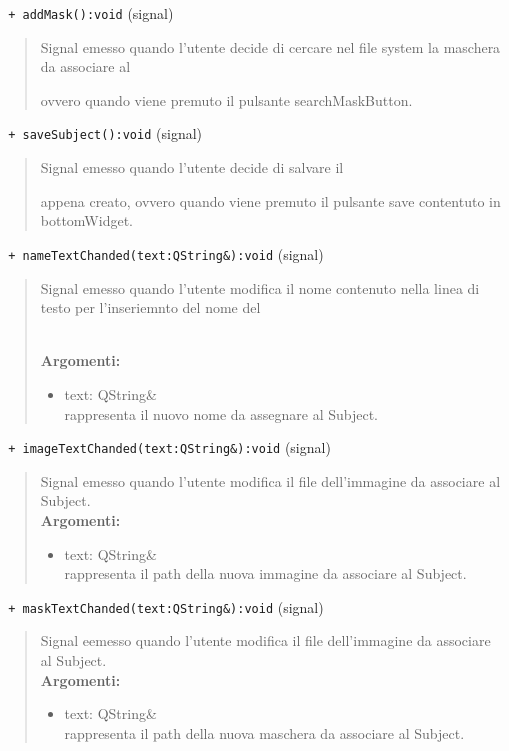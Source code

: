 \color{blue}\verb! + addMask():void! (signal)
\color{black} 
\begin{quote}
Signal\g{} emesso quando l'utente decide di cercare nel file system la maschera da associare al \subject{} ovvero quando viene premuto il pulsante searchMaskButton.
\end{quote}
\color{blue}\verb! + saveSubject():void! (signal)
\color{black} 
\begin{quote}
Signal\g{} emesso quando l'utente decide di salvare il \subject{} appena creato, ovvero quando viene premuto il pulsante save contentuto in bottomWidget.
\end{quote}
\color{blue}\verb! + nameTextChanded(text:QString&):void! (signal)
\color{black} 
\begin{quote}
Signal\g{} emesso quando l'utente modifica il nome contenuto nella linea di testo per l'inseriemnto del nome del \subject.\\
\textbf{Argomenti:}
\begin{itemize}
\item text: QString\&\\ rappresenta il nuovo nome da assegnare al Subject\g{}. 
\end{itemize}
\end{quote}
\color{blue}\verb! + imageTextChanded(text:QString&):void! (signal)
\color{black} 
\begin{quote}
Signal\g{} emesso quando l'utente modifica il file dell'immagine da associare al Subject\g{}. \\
\textbf{Argomenti:}
\begin{itemize}
\item text: QString\&\\ rappresenta il path della nuova immagine da associare al Subject\g{}. 
\end{itemize}
\end{quote}
\color{blue}\verb! + maskTextChanded(text:QString&):void! (signal)
\color{black} 
\begin{quote}
Signal\g{} eemesso quando l'utente modifica il file dell'immagine da associare al Subject\g{}. \\
\textbf{Argomenti:}
\begin{itemize}
\item text: QString\&\\ rappresenta il path della nuova maschera da associare al Subject\g{}. 
\end{itemize}
\end{quote}
\color{black}
\pagebreak
%
